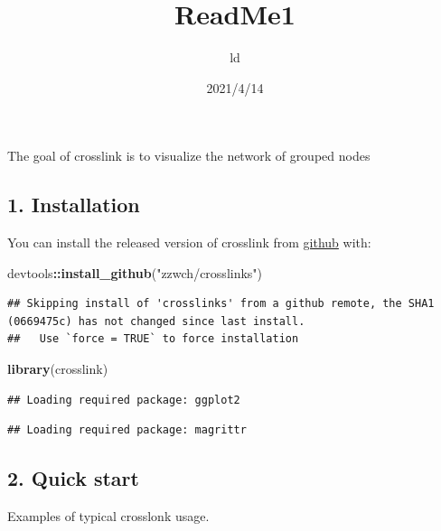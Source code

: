 \documentclass[
]{article}
\title{ReadMe1}
\author{ld}
\date{2021/4/14}
\newenvironment{Shaded}{\begin{snugshade}}{\end{snugshade}}
\newcommand{\DataTypeTok}[1]{\textcolor[rgb]{0.13,0.29,0.53}{#1}}
\newcommand{\KeywordTok}[1]{\textcolor[rgb]{0.13,0.29,0.53}{\textbf{#1}}}
\newcommand{\NormalTok}[1]{#1}
\newcommand{\OperatorTok}[1]{\textcolor[rgb]{0.81,0.36,0.00}{\textbf{#1}}}
\newcommand{\StringTok}[1]{\textcolor[rgb]{0.31,0.60,0.02}{#1}}
\begin{document}
\maketitle

The goal of crosslink is to visualize the network of grouped nodes

\hypertarget{installation}{%
\subsection{1. Installation}\label{installation}}

You can install the released version of crosslink from
\href{https://github.com/zzwch/crosslink}{github} with:

\begin{Shaded}
\begin{Highlighting}[]
\NormalTok{devtools}\OperatorTok{::}\KeywordTok{install_github}\NormalTok{(}\StringTok{"zzwch/crosslinks"}\NormalTok{) }
\end{Highlighting}
\end{Shaded}

\begin{verbatim}
## Skipping install of 'crosslinks' from a github remote, the SHA1 (0669475c) has not changed since last install.
##   Use `force = TRUE` to force installation
\end{verbatim}

\begin{Shaded}
\begin{Highlighting}[]
\KeywordTok{library}\NormalTok{(crosslink)}
\end{Highlighting}
\end{Shaded}

\begin{verbatim}
## Loading required package: ggplot2
\end{verbatim}

\begin{verbatim}
## Loading required package: magrittr
\end{verbatim}

\hypertarget{quick-start}{%
\subsection{2. Quick start}\label{quick-start}}

Examples of typical crosslonk usage.

\begin{Shaded}
\end{Shaded}
\end{document}
